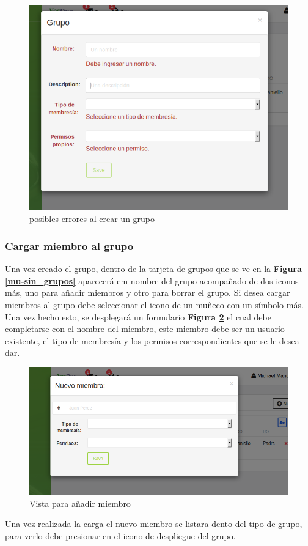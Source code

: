 \documentclass[a4paper,12pt]{article}
\begin{document}
    \begin{figure}
    	\centering
    	\includegraphics[width=.8\textwidth]{img/manual_de_usuario/crear_grupo_errores}
    	\caption{posibles errores al crear un grupo}
    	\label{mu-crear_grupo_errores}
    \end{figure}


\subsubsection{Cargar miembro al grupo}

Una vez creado el grupo, dentro de la tarjeta de grupos que se ve en la \textbf{Figura \ref{mu-sin_grupos}} aparecerá em nombre del grupo acompañado de dos iconos más, uno para añadir miembros y otro para borrar el grupo. Si desea cargar miembros al grupo debe seleccionar el icono de un muñeco con un símbolo más. Una vez hecho esto, se desplegará un formulario \textbf{Figura \ref{mu-anadir_miembro}} el cual debe completarse con el nombre del miembro, este miembro debe ser un usuario existente, el tipo de membresía y los permisos correspondientes que se le desea dar.
    \begin{figure}
    	\centering
    	\includegraphics[width=.8\textwidth]{img/manual_de_usuario/aniadir_miembro}
    	\caption{Vista para añadir miembro}
    	\label{mu-anadir_miembro}
    \end{figure}
Una vez realizada la carga el nuevo miembro se listara dento del tipo de grupo, para verlo debe presionar en el icono de despliegue del grupo.
\end{document}
